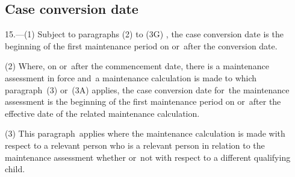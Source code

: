 \documentclass[12pt,a4paper]{article}
\begin{document}

\subsection[15. Case conversion date]{Case conversion date}

15.---(1)  Subject to 
paragraphs (2) to (3G)%
, the case conversion date is the beginning of the first maintenance period on or~after the conversion date.

(2) Where, on or~after the commencement date, there is a maintenance assessment in force and~a maintenance calculation is made to which paragraph~(3) 
or~(3A)  %
applies, the case conversion date for~the maintenance assessment 
is  %
the beginning of the first maintenance period on or~after the effective date of the related maintenance calculation.

%

(3) This paragraph~applies where the maintenance calculation is made with respect to a relevant person who is a relevant person in relation to the maintenance assessment whether or~not with respect to a different qualifying child.
\end{document}
